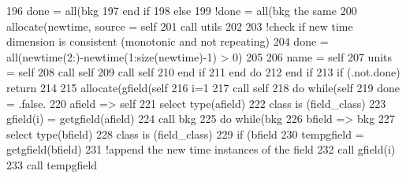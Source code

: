 \begin{DoxyCode}
196                     done = all(bkg%
197 \textcolor{keywordflow}{                end if}
198             \textcolor{keywordflow}{else}
199                 \textcolor{comment}{!done = all(bkg%
       the same}
200                 \textcolor{keyword}{allocate}(newtime, source = self%
201                 \textcolor{keyword}{call }utils%
202                 
203                 \textcolor{comment}{!check if new time dimension is consistent (monotonic and not repeating)}
204                 done = all(newtime(2:)-newtime(1:\textcolor{keyword}{size}(newtime)-1) > 0)
205                 
206                 name = self%
207                 units = self%
208                 \textcolor{keyword}{call }self%
209                 \textcolor{keyword}{call }self%
210 \textcolor{keywordflow}{            end if}
211 \textcolor{keywordflow}{        end do}
212 \textcolor{keywordflow}{    end if}
213     \textcolor{keywordflow}{if} (.not.done) \textcolor{keywordflow}{return}
214 
215     \textcolor{keyword}{allocate}(gfield(self%
216     i=1
217     \textcolor{keyword}{call }self%
218     \textcolor{keywordflow}{do} \textcolor{keywordflow}{while}(self%
219         done = .false.
220         afield => self%
221         \textcolor{keywordflow}{select type}(afield)
222 \textcolor{keywordflow}{        class is} (field\_class)
223             gfield(i) = getgfield(afield)
224             \textcolor{keyword}{call }bkg%
225             \textcolor{keywordflow}{do} \textcolor{keywordflow}{while}(bkg%
226                 bfield => bkg%
227                 \textcolor{keywordflow}{select type}(bfield)
228 \textcolor{keywordflow}{                class is} (field\_class)
229                     \textcolor{keywordflow}{if} (bfield%
230                         tempgfield = getgfield(bfield)
231                         \textcolor{comment}{!append the new time instances of the field}
232                         \textcolor{keyword}{call }gfield(i)%
233                         \textcolor{keyword}{call }tempgfield%

\end{DoxyCode}
